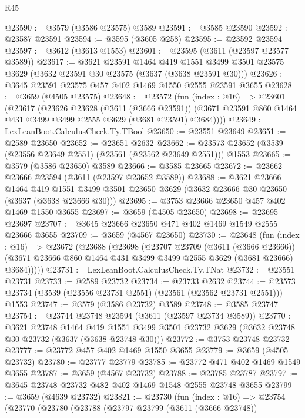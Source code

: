 \begin{lexlean}{R45}
\begin{coremodule}
@23590 := @3579 (@3586 @23575) @3589
@23591 := @3585 @23590
@23592 := @23587 @23591
@23594 := @3595 (@3605 @258)
@23595 := @23592 @23594
@23597 := @3612 (@3613 @1553)
@23601 := @23595 (@3611 (@23597 @23577 @3589))
@23617 := @3621
    @23591
    @1464
    @419
    @1551
    @3499
    @3501
    @23575
    @3629
    (@3632 @23591 @30 @23575 (@3637 (@3638 @23591 @30)))
@23626 := @3645 @23591 @23575 @457 @402 @1469 @1550 @2555 @23591 @3655
@23628 := @3659 (@4505 @23575)
@23648 := @23572
    (fun (index : @16) =>
    @23601
      (@23617
        (@23626
          @23628
          (@3611 (@3666 @23591))
          (@3671 @23591 @860 @1464 @431 @3499 @3499 @2555 @3629 (@3681 @23591) @3684))))
@23649 := LexLeanBoot.CalculusCheck.Ty.TBool
@23650 := @23551 @23649
@23651 := @2589 @23650
@23652 := @23651 @2632
@23662 := @23573 @23652 (@3539 (@23556 @23649 @2551) (@23561 (@23562 @23649 @2551))) @1553
@23665 := @3579 (@3586 @23650) @3589
@23666 := @3585 @23665
@23672 := @23662 @23666 @23594 (@3611 (@23597 @23652 @3589))
@23688 := @3621
    @23666
    @1464
    @419
    @1551
    @3499
    @3501
    @23650
    @3629
    (@3632 @23666 @30 @23650 (@3637 (@3638 @23666 @30)))
@23695 := @3753 @23666 @23650 @457 @402 @1469 @1550 @3655
@23697 := @3659 (@4505 @23650)
@23698 := @23695 @23697
@23707 := @3645 @23666 @23650 @471 @402 @1469 @1549 @2555 @23666 @3655
@23709 := @3659 (@4567 @23650)
@23730 := @23648
    (fun (index : @16) =>
    @23672
      (@23688
        (@23698
          (@23707
            @23709
            (@3611 (@3666 @23666))
            (@3671 @23666 @860 @1464 @431 @3499 @3499 @2555 @3629 (@3681 @23666) @3684)))))
@23731 := LexLeanBoot.CalculusCheck.Ty.TNat
@23732 := @23551 @23731
@23733 := @2589 @23732
@23734 := @23733 @2632
@23744 := @23573 @23734 (@3539 (@23556 @23731 @2551) (@23561 (@23562 @23731 @2551))) @1553
@23747 := @3579 (@3586 @23732) @3589
@23748 := @3585 @23747
@23754 := @23744 @23748 @23594 (@3611 (@23597 @23734 @3589))
@23770 := @3621
    @23748
    @1464
    @419
    @1551
    @3499
    @3501
    @23732
    @3629
    (@3632 @23748 @30 @23732 (@3637 (@3638 @23748 @30)))
@23772 := @3753 @23748 @23732
@23777 := @23772 @457 @402 @1469 @1550 @3655
@23779 := @3659 (@4505 @23732)
@23780 := @23777 @23779
@23785 := @23772 @471 @402 @1469 @1549 @3655
@23787 := @3659 (@4567 @23732)
@23788 := @23785 @23787
@23797 := @3645 @23748 @23732 @482 @402 @1469 @1548 @2555 @23748 @3655
@23799 := @3659 (@4639 @23732)
@23821 := @23730
    (fun (index : @16) =>
    @23754
      (@23770
        (@23780
          (@23788
            (@23797
              @23799
              (@3611 (@3666 @23748))

\end{coremodule}
\end{lexlean}
